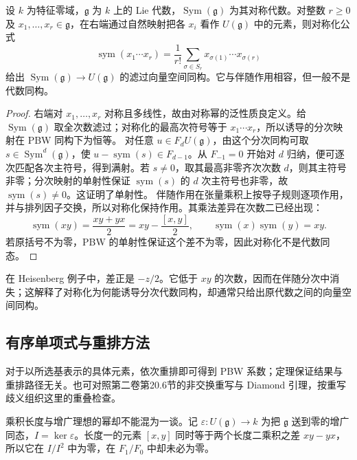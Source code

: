 \begin{proposition}\label{b5:prop:pbw-symmetrization}
	设 \(k\) 为特征零域，\(\mathfrak g\) 为 \(k\) 上的 Lie 代数，\(\operatorname{Sym}(\mathfrak g)\) 为其对称代数。对整数 \(r\ge0\) 及 \(x_1,\ldots,x_r\in\mathfrak g\)，在右端通过自然映射把各 \(x_i\) 看作 \(U(\mathfrak g)\) 中的元素，则对称化公式
	\[
		\operatorname{sym}(x_1\cdots x_r) =\frac1{r!}\sum_{\sigma\in S_r}x_{\sigma(1)}\cdots x_{\sigma(r)}
	\]
	给出 \(\operatorname{Sym}(\mathfrak g)\to U(\mathfrak g)\) 的滤过向量空间同构。它与伴随作用相容，但一般不是代数同构。
\end{proposition}
\begin{proof}
	右端对 \(x_1,\ldots,x_r\) 对称且多线性，故由对称幂的泛性质良定义。给 \(\operatorname{Sym}(\mathfrak g)\) 取全次数滤过；对称化的最高次符号等于 \(x_1\cdots x_r\)，所以诱导的分次映射在 PBW 同构下为恒等。 对任意 \(u\in F_dU(\mathfrak g)\)，由这个分次同构可取 \(s\in\operatorname{Sym}^d(\mathfrak g)\)，使 \(u-\operatorname{sym}(s)\in F_{d-1}\)。从 \(F_{-1}=0\) 开始对 \(d\) 归纳，便可逐次匹配各次主符号，得到满射。若 \(s\ne0\)，取其最高非零齐次次数 \(d\)，则其主符号非零；分次映射的单射性保证 \(\operatorname{sym}(s)\) 的 \(d\) 次主符号也非零，故 \(\operatorname{sym}(s)\ne0\)。这证明了单射性。 伴随作用在张量乘积上按导子规则逐项作用，并与排列因子交换，所以对称化保持作用。其乘法差异在次数二已经出现：
	\[
		\operatorname{sym}(xy)=\frac{xy+yx}{2} =xy-\frac{[x,y]}2, \qquad \operatorname{sym}(x)\operatorname{sym}(y)=xy.
	\]
	若原括号不为零，PBW 的单射性保证这个差不为零，因此对称化不是代数同态。
\end{proof}
在 Heisenberg 例子中，差正是 \(-z/2\)。它低于 \(xy\) 的次数，因而在伴随分次中消失；这解释了对称化为何能诱导分次代数同构，却通常只给出原代数之间的向量空间同构。

\subsection{有序单项式与重排方法}
\label{b5:subsec:1502:04}

对于以所选基表示的具体元素，依次重排即可得到 PBW 系数；定理保证结果与重排路径无关。也可对照第二卷第20.6节的非交换重写与 Diamond 引理，按重写歧义组织这里的重叠检查。

\ProseParagraphBreak

乘积长度与增广理想的幂却不能混为一谈。记 \(\varepsilon:U(\mathfrak g)\to k\) 为把 \(\mathfrak g\) 送到零的增广同态，\(I=\ker\varepsilon\)。长度一的元素 \([x,y]\) 同时等于两个长度二乘积之差 \(xy-yx\)，所以它在 \(I/I^2\) 中为零，在 \(F_1/F_0\) 中却未必为零。

